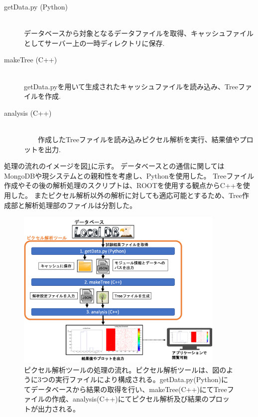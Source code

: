\begin{description}
  \item[getData.py (Python)]\mbox{}\\ 
    データベースから対象となるデータファイルを取得、キャッシュファイルとしてサーバー上の一時ディレクトリに保存.
  \item[makeTree (C++)]\mbox{}\\ 
    getData.pyを用いて生成されたキャッシュファイルを読み込み、Treeファイルを作成.
  \item[analysis (C++)]\mbox{}\\ 
　　作成したTreeファイルを読み込みピクセル解析を実行、結果値やプロットを出力.
\end{description}

処理の流れのイメージを図\ref{analysis_tool_flow}に示す。
データベースとの通信に関してはMongoDBや現システムとの親和性を考慮し、Pythonを使用した。
Treeファイル作成やその後の解析処理のスクリプトは、ROOTを使用する観点からC++を使用した。
またピクセル解析以外の解析に対しても適応可能とするため、Tree作成部と解析処理部のファイルは分割した。

\begin{figure}[bpt]\centering
\includegraphics[width=10cm]{analysis_tool_flow}
\caption[ピクセル解析ツールの処理の流れ]{ピクセル解析ツールの処理の流れ。ピクセル解析ツールは、図のように3つの実行ファイルにより構成される。getData.py(Python)にてデータベースから結果の取得を行い、makeTree(C++)にてTreeファイルの作成、analysis(C++)にてピクセル解析及び結果のプロットが出力される。}
\label{analysis_tool_flow}
\end{figure}

\clearpage
